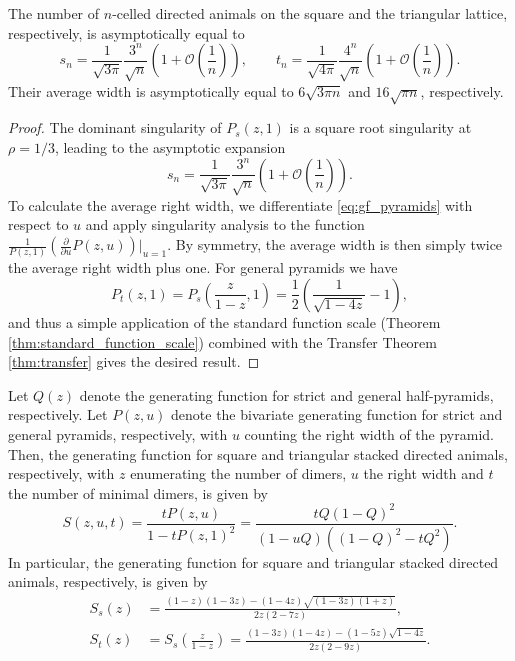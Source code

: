 \begin{corollary}
  The number of $n$-celled directed animals on the square and the triangular lattice, respectively, is asymptotically equal to
  \begin{equation*}
    s_n = \frac{1}{\sqrt{3\pi}}\frac{3^n}{\sqrt{n}}\left(1 + \mathcal{O}\left(\frac{1}{n}\right)\right), \qquad
    t_n = \frac{1}{\sqrt{4\pi}}\frac{4^n}{\sqrt{n}}\left(1 + \mathcal{O}\left(\frac{1}{n}\right)\right).
  \end{equation*}
  Their average width is asymptotically equal to $6\sqrt{3\pi n}$ and $16\sqrt{\pi n}$, respectively.
\end{corollary}

\begin{proof}
  The dominant singularity of $P_s(z,1)$ is a square root singularity at $\rho = 1/3$, leading to the asymptotic expansion
  $$
  s_n = \frac{1}{\sqrt{3\pi}}\frac{3^n}{\sqrt{n}}\left(1 + \mathcal{O}\left(\frac{1}{n}\right)\right).
  $$
  To calculate the average right width, we differentiate \eqref{eq:gf_pyramids} with respect to $u$ and apply singularity analysis to the function $\frac{1}{P(z,1)}\left(\frac{\partial}{\partial u} P(z,u)\right)\big|_{u=1}.$ By symmetry, the average width is then simply twice the average right width plus one. For general pyramids we have
  \begin{equation*}
    P_t(z,1) = P_s\left(\frac{z}{1-z},1\right)
    = \frac{1}{2}\left(\frac{1}{\sqrt{1-4z}} - 1\right),
  \end{equation*}
  and thus a simple application of the standard function scale (Theorem \ref{thm:standard_function_scale}) combined with the Transfer Theorem \ref{thm:transfer} gives the desired result.
\end{proof}

\begin{theorem}
  Let $Q(z)$ denote the generating function for strict and general half-pyramids, respectively. Let $P(z,u)$ denote the bivariate generating function for strict and general pyramids, respectively, with $u$ counting the right width of the pyramid. Then, the generating function for square and triangular stacked directed animals, respectively, with $z$ enumerating the number of dimers, $u$ the right width and $t$ the number of minimal dimers, is given by
  $$
    S(z,u,t) = \frac{t P(z,u)}{1 - t P(z,1)^2} 
    = \frac{t Q(1 - Q)^2}{(1 - uQ)((1- Q)^2 - tQ^2)}.
  $$
  In particular, the generating function for square and triangular stacked directed animals, respectively, is given by 
  \begin{align*}
    S_s(z) &= \frac{(1-z)(1-3z) - (1-4z)\sqrt{(1-3z)(1+z)}}{2z(2 - 7z)}, \\
    S_t(z) &= S_s\left(\frac{z}{1-z}\right) = \frac{(1-3z)(1-4z) - (1-5z)\sqrt{1-4z}}{2z(2-9z)}.
  \end{align*}
\end{theorem}

